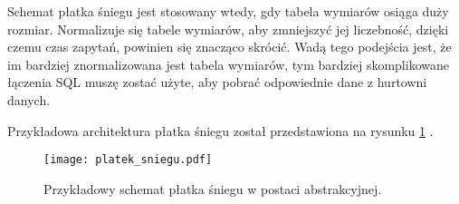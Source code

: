Schemat płatka śniegu jest stosowany wtedy, gdy tabela wymiarów osiąga duży rozmiar.
Normalizuje się tabele wymiarów, aby zmniejszyć jej liczebność, dzięki czemu czas zapytań, 
powinien się znacząco skrócić. 
Wadą tego podejścia jest, że im bardziej znormalizowana jest tabela wymiarów,  
 tym bardziej skomplikowane łączenia SQL muszę zostać użyte, aby pobrać odpowiednie
dane z hurtowni danych. \cite{TodMan} \cite{cube}

Przykładowa architektura płatka śniegu został przedstawiona na rysunku \ref{fig:platek_sniegu} .

\begin{center}
\begin{figure}[H]
  \begin{center}
    \texttt{[image: platek\_sniegu.pdf]}
  \end{center}
  \caption{Przykładowy schemat płatka śniegu w postaci abstrakcyjnej. }
    \label{fig:platek_sniegu}
\end{figure}
\end{center}







\begin{comment}
 
\end{comment}
